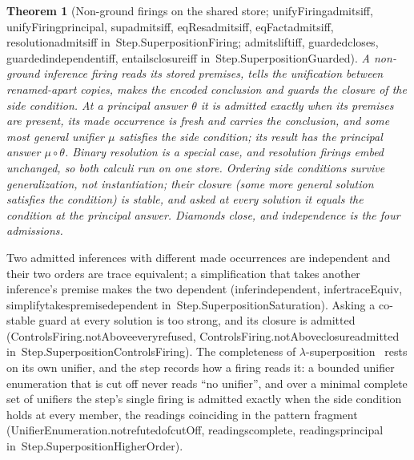 \documentclass[11pt]{article}
\newtheorem{theorem}{Theorem}
\theoremstyle{remark}
\newcommand{\lean}[1]{{\ttfamily\def\_{\textunderscore\allowbreak}#1}}
\newcommand{\inmod}[1]{in~{\ttfamily\def\_{\textunderscore\allowbreak}#1}}
\begin{document}
\begin{theorem}[Non-ground firings on the shared store; \lean{unifyFiring\_admits\_iff}, \lean{unifyFiring\_principal}, \lean{sup\_admits\_iff}, \lean{eqRes\_admits\_iff}, \lean{eqFact\_admits\_iff}, \lean{resolution\_admits\_iff} \inmod{Step.SuperpositionFiring}; \lean{admits\_lift\_iff}, \lean{guarded\_closes}, \lean{guarded\_independent\_iff}, \lean{entails\_closure\_iff} \inmod{Step.SuperpositionGuarded}]
A non-ground inference firing reads its stored premises, tells the unification between renamed-apart
copies, makes the encoded conclusion and guards the closure of the side condition. At a principal answer
$\theta$ it is admitted exactly when its premises are present, its made occurrence is fresh and carries the
conclusion, and some most general unifier $\mu$ satisfies the side condition; its result has the
principal answer $\mu\circ\theta$. Binary resolution is a special case, and resolution firings embed
unchanged, so both calculi run on one store. Ordering side conditions survive generalization, not
instantiation; their closure (some more general solution satisfies the condition) is stable, and asked
at every solution it equals the condition at the principal answer. Diamonds close, and independence is
the four admissions.
\end{theorem}

Two admitted inferences with different made occurrences are independent and their two orders are trace
equivalent; a simplification that takes another inference's premise makes the two dependent
(\lean{infer\_independent}, \lean{infer\_traceEquiv}, \lean{simplify\_takes\_premise\_dependent} \inmod{Step.SuperpositionSaturation}). Asking a
co-stable guard at every solution is too strong, and its closure is admitted
(\lean{ControlsFiring.notAbove\_every\_refused}, \lean{ControlsFiring.notAbove\_closure\_admitted}
\inmod{Step.SuperpositionControlsFiring}). The completeness of $\lambda$-superposition~\cite{bentkamp21} rests on
its own unifier, and the step records how a firing reads it: a bounded unifier
enumeration that is cut off never reads ``no unifier'', and over a minimal complete set of unifiers the
step's single firing is admitted exactly when the side condition holds at every member, the readings
coinciding in the pattern fragment (\lean{UnifierEnumeration.not\_refuted\_of\_cutOff},
\lean{readings\_complete}, \lean{readings\_principal} \inmod{Step.SuperpositionHigherOrder}).
\end{document}
